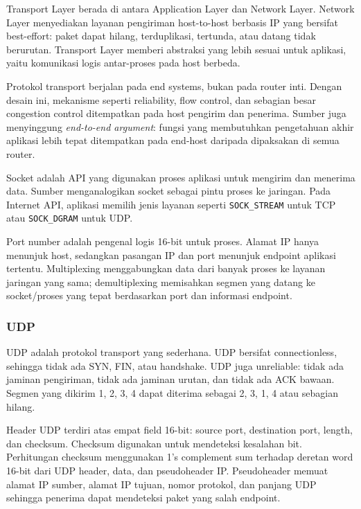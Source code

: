 \begin{jawab}
Transport Layer berada di antara Application Layer dan Network Layer. Network Layer menyediakan layanan pengiriman host-to-host berbasis IP yang bersifat best-effort: paket dapat hilang, terduplikasi, tertunda, atau datang tidak berurutan. Transport Layer memberi abstraksi yang lebih sesuai untuk aplikasi, yaitu komunikasi logis antar-proses pada host berbeda.
\end{jawab}

Protokol transport berjalan pada end systems, bukan pada router inti. Dengan desain ini, mekanisme seperti reliability, flow control, dan sebagian besar congestion control ditempatkan pada host pengirim dan penerima. Sumber juga menyinggung \textit{end-to-end argument}: fungsi yang membutuhkan pengetahuan akhir aplikasi lebih tepat ditempatkan pada end-host daripada dipaksakan di semua router.

Socket adalah API yang digunakan proses aplikasi untuk mengirim dan menerima data. Sumber menganalogikan socket sebagai pintu proses ke jaringan. Pada Internet API, aplikasi memilih jenis layanan seperti \texttt{SOCK\_STREAM} untuk TCP atau \texttt{SOCK\_DGRAM} untuk UDP.

Port number adalah pengenal logis 16-bit untuk proses. Alamat IP hanya menunjuk host, sedangkan pasangan IP dan port menunjuk endpoint aplikasi tertentu. Multiplexing menggabungkan data dari banyak proses ke layanan jaringan yang sama; demultiplexing memisahkan segmen yang datang ke socket/proses yang tepat berdasarkan port dan informasi endpoint.

\subsubsection*{UDP}

UDP adalah protokol transport yang sederhana. UDP bersifat connectionless, sehingga tidak ada SYN, FIN, atau handshake. UDP juga unreliable: tidak ada jaminan pengiriman, tidak ada jaminan urutan, dan tidak ada ACK bawaan. Segmen yang dikirim 1, 2, 3, 4 dapat diterima sebagai 2, 3, 1, 4 atau sebagian hilang.

Header UDP terdiri atas empat field 16-bit: source port, destination port, length, dan checksum. Checksum digunakan untuk mendeteksi kesalahan bit. Perhitungan checksum menggunakan 1's complement sum terhadap deretan word 16-bit dari UDP header, data, dan pseudoheader IP. Pseudoheader memuat alamat IP sumber, alamat IP tujuan, nomor protokol, dan panjang UDP sehingga penerima dapat mendeteksi paket yang salah endpoint.

